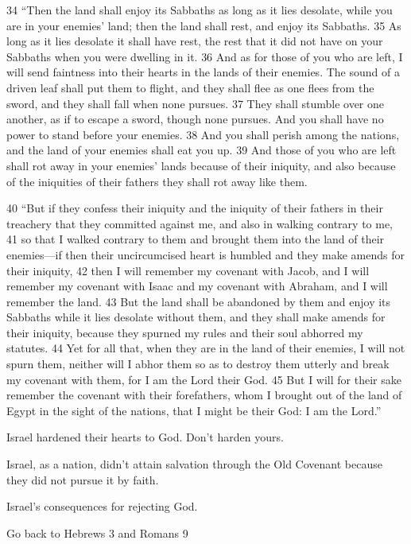 \begin{bible}
34 ``Then the land shall enjoy its Sabbaths as long as it lies desolate, while you are in your enemies' land; then the land shall rest, and enjoy its Sabbaths. 35 As long as it lies desolate it shall have rest, the rest that it did not have on your Sabbaths when you were dwelling in it. 36 And as for those of you who are left, I will send faintness into their hearts in the lands of their enemies. The sound of a driven leaf shall put them to flight, and they shall flee as one flees from the sword, and they shall fall when none pursues. 37 They shall stumble over one another, as if to escape a sword, though none pursues. And you shall have no power to stand before your enemies. 38 And you shall perish among the nations, and the land of your enemies shall eat you up. 39 And those of you who are left shall rot away in your enemies' lands because of their iniquity, and also because of the iniquities of their fathers they shall rot away like them.

40 ``But if they confess their iniquity and the iniquity of their fathers in their treachery that they committed against me, and also in walking contrary to me, 41 so that I walked contrary to them and brought them into the land of their enemies—if then their uncircumcised heart is humbled and they make amends for their iniquity, 42 then I will remember my covenant with Jacob, and I will remember my covenant with Isaac and my covenant with Abraham, and I will remember the land. 43 But the land shall be abandoned by them and enjoy its Sabbaths while it lies desolate without them, and they shall make amends for their iniquity, because they spurned my rules and their soul abhorred my statutes. 44 Yet for all that, when they are in the land of their enemies, I will not spurn them, neither will I abhor them so as to destroy them utterly and break my covenant with them, for I am the Lord their God. 45 But I will for their sake remember the covenant with their forefathers, whom I brought out of the land of Egypt in the sight of the nations, that I might be their God: I am the Lord.''
		
\end{bible}

\begin{discussion}



 Israel hardened their hearts to God.  Don't harden yours.

 Israel, as a nation,  didn't attain salvation through the Old Covenant because they did not pursue it by faith.


 Israel's consequences for rejecting God.

Go back to Hebrews 3 and Romans 9

\end{discussion}

